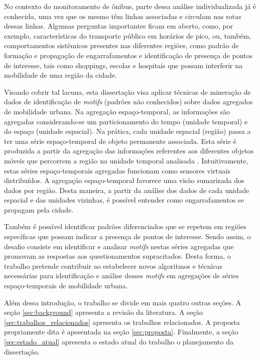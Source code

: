 \documentclass[12pt]{report} %
\begin{document}
No contexto do monitoramento de ônibus, parte dessa análise individualizada já é conhecida, uma vez que os mesmo têm linhas associadas e circulam nas rotas dessas linhas. Algumas perguntas importantes ficam em aberto, como, por exemplo, características do transporte público em horários de pico, ou, também, comportamentos sistêmicos presentes nas diferentes regiões, como padrão de formação e propagação de engarrafamentos e identificação de presença de pontos de interesse, tais como shoppings, escolas e hospitais que possam interferir na mobilidade de uma região da cidade.

Visando cobrir tal lacuna, esta dissertação visa aplicar técnicas de mineração de dados de identificação de \emph{motifs} (padrões não conhecidos) sobre dados agregados de mobilidade urbana. Na agregação espaço-temporal, as informações são agregadas considerando-se um particionamento do tempo (unidade temporal) e do espaço (unidade espacial). Na prática, cada unidade espacial (região) passa a ter uma série espaço-temporal de objeto permanente associada. Esta série é produzida a partir da agregação das informações referentes aos diferentes objetos móveis que percorrem a região na unidade temporal analisada \citep{tao2004spatio}. Intuitivamente, estas séries espaço-temporais agregadas funcionam como sensores virtuais distribuídos. A agregação espaço-temporal favorece uma visão sumarizada dos dados por região. Desta maneira, a partir da análise dos dados de cada unidade espacial e das unidades vizinhas, é possível entender como engarrafamentos se propagam pela cidade. 

Também é possível identificar padrões diferenciados que se repetem em regiões específicas que possam indicar a presença de pontos de interesse. Sendo assim, o desafio consiste em identificar e analisar \emph{motifs} nestas séries agregadas que promovam as respostas aos questionamentos supracitados. Desta forma, o trabalho pretende contribuir ao estabelecer novos algoritmos e técnicas necessárias para identificação e análise desses \emph{motifs} em agregações de séries espaço-temporais de mobilidade urbana. 

Além dessa introdução, o trabalho se divide em mais quatro outras seções. A seção \ref{sec:background} apresenta a revisão da literatura. A seção \ref{sec:trabalhos_relacionados} apresenta os trabalhos relacionados. A proposta propriamente dita é apesentada na seção \ref{sec:proposta}. Finalmente, a seção \ref{sec:estado_atual} apresenta o estado atual do trabalho o planejamento da dissertação. 
\end{document}
